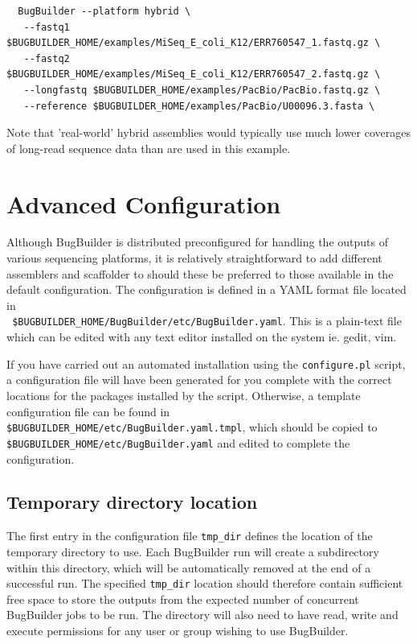 \documentclass[a4paper,10pt]{article}
\begin{document}
\begin{verbatim}
  BugBuilder --platform hybrid \
   --fastq1 $BUGBUILDER_HOME/examples/MiSeq_E_coli_K12/ERR760547_1.fastq.gz \
   --fastq2 $BUGBUILDER_HOME/examples/MiSeq_E_coli_K12/ERR760547_2.fastq.gz \
   --longfastq $BUGBUILDER_HOME/examples/PacBio/PacBio.fastq.gz \
   --reference $BUGBUILDER_HOME/examples/PacBio/U00096.3.fasta \
\end{verbatim}

Note that 'real-world' hybrid assemblies would typically use much  lower
coverages of long-read sequence data than are used in this example.

\section{Advanced Configuration}

Although BugBuilder is distributed preconfigured for handling the outputs of
various sequencing platforms, it is relatively straightforward to add different
assemblers and scaffolder to should these be preferred to those available in
the default configuration. The configuration is defined in a YAML format file located in \\ {\tt
\$BUGBUILDER\_HOME/BugBuilder/etc/BugBuilder.yaml}. This is a plain-text file
which can be edited with any text editor installed on the system ie. gedit,
vim. 

If you have carried out an automated installation using the {\tt configure.pl}
script, a configuration file will have been generated for you complete with the
correct locations for the packages installed by the script. Otherwise, a
template configuration file can be found in {\tt
\$BUGBUILDER\_HOME/etc/BugBuilder.yaml.tmpl}, which should be copied to {\tt
\$BUGBUILDER\_HOME/etc/BugBuilder.yaml} and edited to complete the
configuration.

\subsection{Temporary directory location}

The first entry in the configuration file {\tt tmp\_dir} defines the location of
the temporary directory to use. Each BugBuilder run will create a subdirectory
within this directory, which will be automatically removed at the end of a
successful run.  The specified {\tt tmp\_dir} location should therefore contain
sufficient free space to store the outputs from the expected number of
concurrent BugBuilder jobs to be run. The directory will also  need to have
read, write and execute permissions for any user or group wishing to use
BugBuilder.
\end{document}
